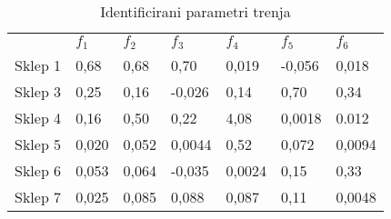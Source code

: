 \begin{table}[]
\centering
\label{table:friction_params}
\begin{tabular}{|l||l|l|l|l|l|l|}
\cline{2-7}
\hhline{~------}
\multicolumn{1}{c|}{}  & $ f_1 $ & $ f_2 $ & $ f_3 $ & $ f_4 $ & $ f_5 $ & $ f_6 $ \\ \hhline{-======}
Sklep 1 & 0,68 & 0,68 & 0,70 & 0,019 & -0,056 & 0,018 \\ \hline
Sklep 3 & 0,25 & 0,16 & -0,026 & 0,14 & 0,70 & 0,34 \\ \hline
Sklep 4 & 0,16 & 0,50 & 0,22 & 4,08 & 0,0018 & 0.012 \\ \hline
Sklep 5 & 0,020 & 0,052 & 0,0044 & 0,52 & 0,072 & 0,0094 \\ \hline
Sklep 6 & 0,053 & 0,064 & -0,035 & 0,0024 & 0,15 & 0,33 \\ \hline
Sklep 7 & 0,025 & 0,085 & 0,088 & 0,087 & 0,11 & 0,0048 \\ \hline
\end{tabular}
\caption{Identificirani parametri trenja}
\end{table}